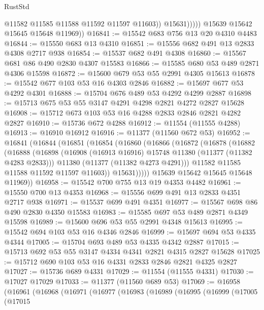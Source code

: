 \begin{lexlean}{RustStd}
\begin{coremodule}
                      @11582
                      @11585
                      @11588
                      @11592
                      @11597
                      @11603))
                  @15631)))))
        @15639
        @15642
        @15645
        @15648
        @11969))
@16841 := @15542 @683 @756 @13 @20 @4310 @4483
@16844 := @15550 @683 @13 @4310
@16851 := @15556 @682 @491 @13 @2833 @4308 @2717 @938
@16854 := @15537 @682 @491 @4308
@16860 := @15567 @681 @86 @490 @2830 @4307 @15583
@16866 := @15585 @680 @53 @489 @2871 @4306 @15598
@16872 := @15600 @679 @53 @55 @2991 @4305 @15613
@16878 := @15542 @677 @103 @53 @16 @4303 @2846
@16882 := @15697 @677 @53 @4292 @4301
@16888 := @15704 @676 @489 @53 @4292 @4299 @2887
@16898 := @15713 @675 @53 @55 @3147 @4291 @4298 @2821 @4272 @2827 @15628
@16908 := @15712 @673 @103 @53 @16 @4288 @2833 @2846 @2821 @4282 @2827
@16910 := @15736 @672 @4288
@16912 := @11554 (@11555 @4288)
@16913 := @16910 @16912
@16916 := @11377 (@11560 @672 @53)
@16952 := @16841
    (@16844
      (@16851
        (@16854
          (@16860
            (@16866
              (@16872
                (@16878
                  (@16882
                    (@16888
                      (@16898
                        (@16908 (@16913 @16916) @15748 @11380 (@11377 (@11382 @4283 @2833)))
                        @11380
                        (@11377 (@11382 @4273 @4291)))
                      @11582
                      @11585
                      @11588
                      @11592
                      @11597
                      @11603))
                  @15631)))))
        @15639
        @15642
        @15645
        @15648
        @11969))
@16958 := @15542 @700 @755 @13 @19 @4353 @4482
@16961 := @15550 @700 @13 @4353
@16968 := @15556 @699 @491 @13 @2833 @4351 @2717 @938
@16971 := @15537 @699 @491 @4351
@16977 := @15567 @698 @86 @490 @2830 @4350 @15583
@16983 := @15585 @697 @53 @489 @2871 @4349 @15598
@16989 := @15600 @696 @53 @55 @2991 @4348 @15613
@16995 := @15542 @694 @103 @53 @16 @4346 @2846
@16999 := @15697 @694 @53 @4335 @4344
@17005 := @15704 @693 @489 @53 @4335 @4342 @2887
@17015 := @15713 @692 @53 @55 @3147 @4334 @4341 @2821 @4315 @2827 @15628
@17025 := @15712 @690 @103 @53 @16 @4331 @2833 @2846 @2821 @4325 @2827
@17027 := @15736 @689 @4331
@17029 := @11554 (@11555 @4331)
@17030 := @17027 @17029
@17033 := @11377 (@11560 @689 @53)
@17069 := @16958
    (@16961
      (@16968
        (@16971
          (@16977
            (@16983
              (@16989
                (@16995
                  (@16999
                    (@17005
                      (@17015

\end{coremodule}
\end{lexlean}
